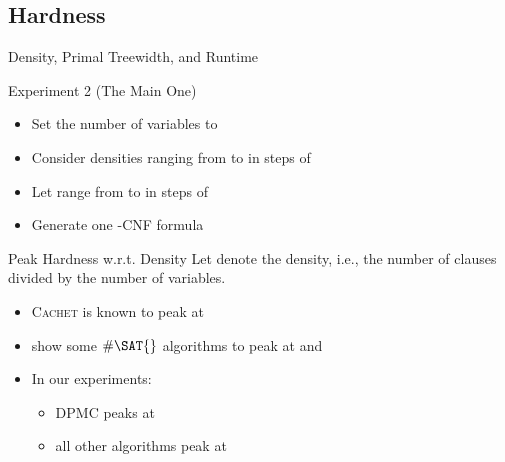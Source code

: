 \documentclass{beamer}
\begin{document}
\subsection{Hardness}

\begin{frame}{Density, Primal Treewidth, and Runtime}
  \begin{block}{Experiment 2 (The Main One)}
    \begin{itemize}
      \item Set the number of variables to 
      \item Consider densities ranging from  to 
            in steps of 
      \item Let \structure{$\rho$} range from  to
             in steps of 
      \item Generate one -CNF formula
    \end{itemize}
  \end{block}
\end{frame}

\begin{frame}{Peak Hardness w.r.t. Density}
  Let \structure{$\mu$} denote the \alert{density}, i.e., the number of clauses
  divided by the number of variables.
  \begin{itemize}
    \item \textsc{Cachet} is known to peak at 
          \textcolor{gray}{\parencite{DBLP:conf/sat/SangBBKP04}}
    \item \textcolor{gray}{\textcite{DBLP:conf/aaai/Pehoushek00}} show some
          $\#\SAT{}$ algorithms to peak at  and
          \pause
    \item In our experiments:
    \begin{itemize}
      \item \textsc{DPMC} peaks at 
      \item all other algorithms peak at 
    \end{itemize}
  \end{itemize}
\end{frame}
\end{document}
